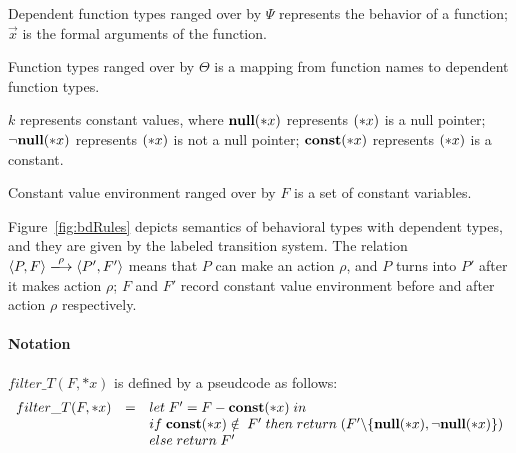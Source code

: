 Dependent function types ranged over by \(\Psi\) represents the
behavior of a function; \(\vec{x}\) is the formal arguments of the
function.

Function types ranged over by \(\Theta\) is a mapping from function names to dependent function types.

\(k\) represents constant values, where \({\bf null}(*x)\) represents
\((*x)\) is a null pointer; \(\neg{\bf null}(*x)\) represents \((*x)\) is not a
null pointer; \(\mathbf{const}(*x)\) represents \((*x)\) is a constant.

Constant value environment ranged over by \(F\) is a set of constant
variables.

Figure~\ref{fig:bdRules} depicts semantics of behavioral types with
dependent types, and they are given by the labeled transition
system. The relation \( \langle P, F \rangle \xlongrightarrow{\rho}
\langle P', F' \rangle \) means that \(P\) can make an action
\(\rho\), and \(P\) turns into \(P'\) after it makes action \(\rho\);
\(F\) and \(F'\) record constant value environment before and after
action \(\rho\) respectively.

\paragraph{Notation}
\(filter\_T(F, *x)\) is defined by a pseudcode as follows:
\[
\begin{array}{lcl}
  filter\_T(F, *x) &=& let \; F' = F - \mathbf{const}(*x) \; in \\
  & & if \; \mathbf{const}(*x) \notin \; F'\; then \; return \; (F' \backslash \{{\bf null}(*x),\neg{\bf null}(*x)\})\\
  & & else \; return \; F'
\end{array}
\]

